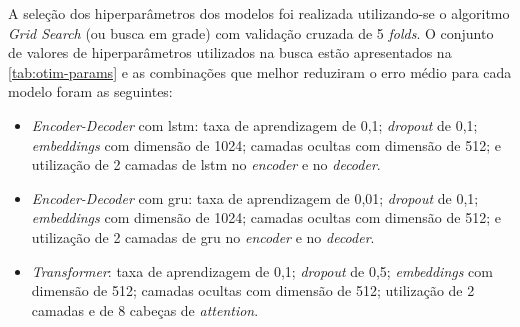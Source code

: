 A seleção dos hiperparâmetros dos modelos foi realizada utilizando-se o algoritmo \textit{Grid Search} (ou busca em grade) com validação cruzada de 5 \textit{folds}. O conjunto de valores de hiperparâmetros utilizados na busca estão apresentados na \autoref{tab:otim-params} e as combinações que melhor reduziram o erro médio para cada modelo foram as seguintes:



\begin{itemize}
    \item \textit{Encoder-Decoder} com \acrshort{lstm}: taxa de aprendizagem de 0,1; \textit{dropout} de 0,1; \textit{embeddings} com dimensão de 1024; camadas ocultas com dimensão de 512; e utilização de 2 camadas de \acrshort{lstm} no \textit{encoder} e no \textit{decoder}.

    \item \textit{Encoder-Decoder} com \acrshort{gru}: taxa de aprendizagem de 0,01; \textit{dropout} de 0,1; \textit{embeddings} com dimensão de 1024; camadas ocultas com dimensão de 512; e utilização de 2 camadas de \acrshort{gru} no \textit{encoder} e no \textit{decoder}.

    \item \textit{Transformer}: taxa de aprendizagem de 0,1; \textit{dropout} de 0,5; \textit{embeddings} com dimensão de 512; camadas ocultas com dimensão de 512; utilização de 2 camadas e de 8 cabeças de \textit{attention}.
\end{itemize}











